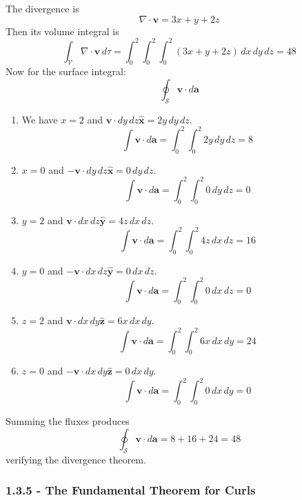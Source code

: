 \documentclass[a4paper]{article}
\begin{document}
The divergence is
\[
	\nabla \cdot \pmb{v} = 3x + y + 2z 
\]
Then its volume integral is
\[
	\int_{\mathcal{V}} \nabla \cdot \pmb{v} \, d \tau = \int^{2}_{0} \int^{2}_{0} \int^{2}_{0} \!\left( 3x + y + 2z \right) \, dx \, dy \, dz = 48
\]
Now for the surface integral:
\[
	\oint_{\mathcal{S}} \pmb{v} \cdot d \pmb{a}  
\]
\begin{enumerate}[label=(\roman*)]
	\item We have \( x = 2 \) and \( \pmb{v} \cdot dy \, dz \pmb{\hat{x}} = 2y \, dy \, dz \).
	\[
		\int \pmb{v} \cdot d \pmb{a} = \int^{2}_{0} \int^{2}_{0} 2y \, dy \, dz = 8
	\]
	\item \( x = 0 \) and \( -\pmb{v} \cdot dy \, dz \pmb{\hat{x}} = 0 \, dy \, dz \).
	\[
		\int \pmb{v} \cdot d \pmb{a} = \int^{2}_{0} \int^{2}_{0} 0 \, dy \, dz = 0
	\]
	\item \( y = 2 \) and \( \pmb{v} \cdot dx \, dz \pmb{\hat{y}} = 4z \, dx \, dz \).
	\[
		\int \pmb{v} \cdot d \pmb{a} = \int^{2}_{0} \int^{2}_{0} 4z \, dx \, dz = 16
	\]
	\item \( y = 0 \) and \( -\pmb{v} \cdot dx \, dz \pmb{\hat{y}} = 0 \, dx \, dz \).
	\[
		\int \pmb{v} \cdot d \pmb{a} = \int^{2}_{0} \int^{2}_{0} 0 \, dx \, dz = 0
	\]
	\item \( z = 2 \) and \( \pmb{v} \cdot dx \, dy \pmb{\hat{z}} = 6x \, dx \, dy \).
	\[
		\int \pmb{v} \cdot d \pmb{a} = \int^{2}_{0} \int^{2}_{0} 6x \, dx \, dy = 24 
	\]
	\item \( z = 0 \) and \( -\pmb{v} \cdot dx \, dy \pmb{\hat{z}} = 0 \, dx \, dy \).
	\[
		\int \pmb{v} \cdot d \pmb{a} = \int^{2}_{0} \int^{2}_{0} 0 \, dx \, dy = 0 
	\]
\end{enumerate}
Summing the fluxes produces 
\[
	\oint_{\mathcal{S}} \pmb{v} \cdot d \pmb{a} = 8 + 16 + 24 = 48 
\]
verifying the divergence theorem.

\newpage
\subsubsection{\textsf{1.3.5 - The Fundamental Theorem for Curls}}
\end{document}
